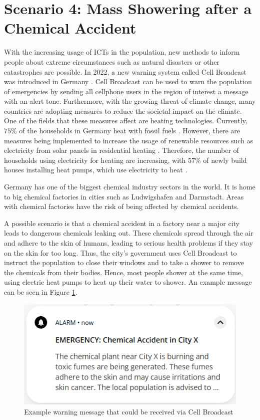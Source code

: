 \section{Scenario 4: Mass Showering after a Chemical Accident}
\label{scenario4total}

With the increasing usage of ICTs in the population,
new methods to inform people about extreme circumstances
such as natural disasters or other catastrophes are possible. In 2022,
a new warning system called Cell Broadcast was introduced in Germany
\cite{TEAlert}. Cell Broadcast can be used to warn the population
of emergencies by sending all cellphone users in the 
region of interest a message with an alert tone.
Furthermore, with the growing threat of climate change, many countries
are adopting measures to reduce the societal impact on the
climate. One of the fields that these measures affect 
are heating technologies. Currently, $75\%$ of the households 
in Germany heat with fossil fuels \cite{bdewhouhseholds}. 
However, there are measures being 
implemented to increase the usage of renewable resources such 
as electricity from solar panels in residential heating
\cite{heizungsgesetz}. Therefore, the number of households 
using electricity for heating are increasing, with 
$57\%$ of newly build houses installing 
heat pumps, which use electricity to heat
\cite{heatingpumps}.

Germany has one of the biggest chemical industry sectors in the world.
It is home to big chemical factories in cities such as Ludwigshafen and
Darmstadt. Areas with chemical factories have the risk of being
affected by chemical accidents.

A possible scenario is that a chemical accident in a 
factory near a major city leads to dangerous chemicals 
leaking out. These chemicals spread through the air 
and adhere to the skin of humans, leading to serious 
health problems if they stay on the skin for too long.
Thus, the city's government uses Cell Broadcast to
instruct the population to close their windows and 
to take a shower to remove the chemicals from their bodies.
Hence, most people shower at the same time,
using electric heat pumps to heat up their water to shower.
An example message can be seen in Figure \ref{warningmessage}.

\begin{figure}[!ht]
    \center
    \includegraphics[scale=.7]{figs/emergencychemical.png}
    \caption{Example warning message that could be received via Cell Broadcast}
    \label{warningmessage}
\end{figure}

